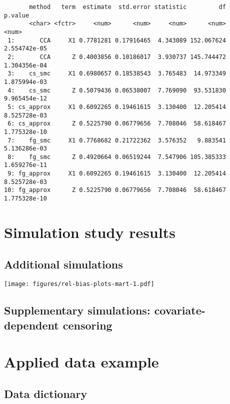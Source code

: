\documentclass[
  12pt,
  a4paper,
]{article}
\begin{document}
\begin{verbatim}
       method   term  estimate  std.error statistic         df      p.value
       <char> <fctr>     <num>      <num>     <num>      <num>        <num>
 1:       CCA     X1 0.7781281 0.17916465  4.343089 152.067624 2.554742e-05
 2:       CCA      Z 0.4003856 0.10186017  3.930737 145.744472 1.304356e-04
 3:    cs_smc     X1 0.6980657 0.18538543  3.765483  14.973349 1.875994e-03
 4:    cs_smc      Z 0.5079436 0.06538007  7.769090  93.531830 9.965454e-12
 5: cs_approx     X1 0.6092265 0.19461615  3.130400  12.205414 8.525728e-03
 6: cs_approx      Z 0.5225790 0.06779656  7.708046  58.618467 1.775328e-10
 7:    fg_smc     X1 0.7768682 0.21722362  3.576352   9.883541 5.136286e-03
 8:    fg_smc      Z 0.4920664 0.06519244  7.547906 105.385333 1.659276e-11
 9: fg_approx     X1 0.6092265 0.19461615  3.130400  12.205414 8.525728e-03
10: fg_approx      Z 0.5225790 0.06779656  7.708046  58.618467 1.775328e-10
\end{verbatim}

\newpage

\section{Simulation study results}\label{simulation-study-results}

\subsection{Additional simulations}\label{additional-simulations}

\texttt{[image: figures/rel-bias-plots-mart-1.pdf]}

\subsection{Supplementary simulations: covariate-dependent
censoring}\label{supplementary-simulations-covariate-dependent-censoring}

\newpage

\section{Applied data example}\label{applied-data-example}

\subsection{Data dictionary}\label{data-dictionary}
\end{document}
